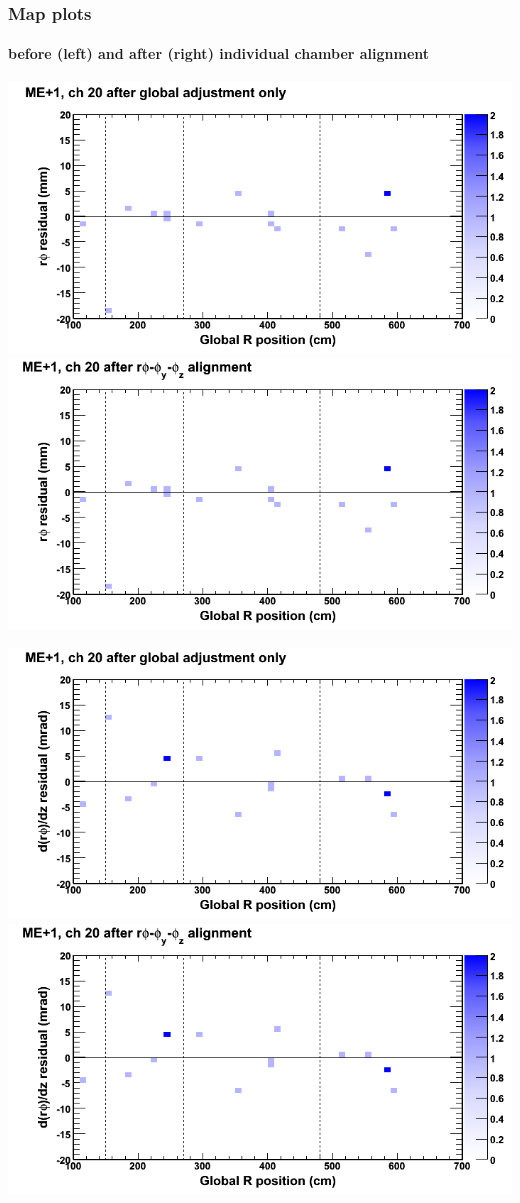 \documentclass[compress]{beamer}
\begin{document}
\begin{frame}
\frametitle{Map plots}
\framesubtitle{before (left) and after (right) individual chamber alignment}
\includegraphics[width=0.5\linewidth]{ringmapplots_3dof/before_CSCvsr_mep1ch20_x.png} \includegraphics[width=0.5\linewidth]{ringmapplots_3dof/after_CSCvsr_mep1ch20_x.png}

\includegraphics[width=0.5\linewidth]{ringmapplots_3dof/before_CSCvsr_mep1ch20_dxdz.png} \includegraphics[width=0.5\linewidth]{ringmapplots_3dof/after_CSCvsr_mep1ch20_dxdz.png}
\end{frame}
\end{document}
